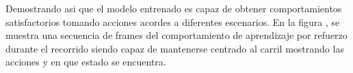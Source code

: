 Demostrando asi que el modelo entrenado es capaz de obtener comportamientos satisfactorios tomando acciones acordes a diferentes escenarios. En la figura , se muestra una secuencia de frames
del comportamiento de aprendizaje por refuerzo durante el recorrido siendo capaz de mantenerse centrado al carril mostrando las acciones y en que estado se encuentra.












        


  

